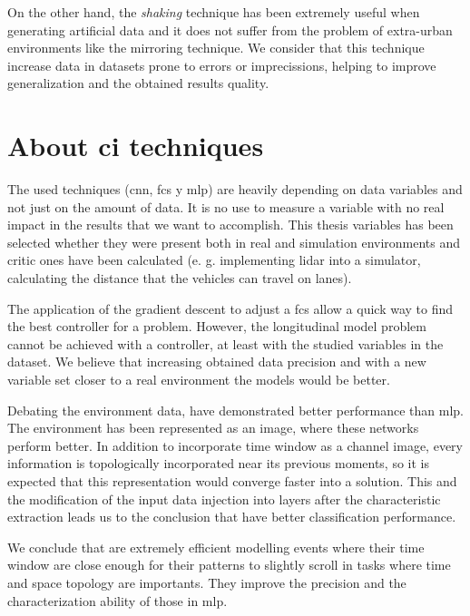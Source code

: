 On the other hand, the \textit{shaking} technique has been extremely useful when generating artificial data and it does not suffer from the problem of extra-urban environments like the mirroring technique. We consider that this technique increase data in datasets prone to errors or imprecissions, helping to improve generalization and the obtained results quality.

\section{About \acrlong{ci} techniques}

The used techniques (\acrlong{cnn}, \acrlong{fcs} y \acrlong{mlp}) are heavily depending on data variables and not just on the amount of data. It is no use to measure a variable with no real impact in the results that we want to accomplish. This thesis variables has been selected whether they were present both in real and simulation environments and critic ones have been calculated (e. g. implementing \acrshort{lidar} into a simulator, calculating the distance that the vehicles can travel on lanes).

The application of the gradient descent to adjust a \acrlong{fcs} allow a quick way to find the best controller for a problem. However, the longitudinal model problem cannot be achieved with a controller, at least with the studied variables in the dataset. We believe that increasing obtained data precision and with a new variable set closer to a real environment the models would be better.

Debating the environment data,  have demonstrated better performance than \acrlong{mlp}. The environment has been represented as an image, where these networks perform better. In addition to incorporate time window as a channel image, every information is topologically incorporated near its previous moments, so it is expected that this representation would converge faster into a solution. This and the modification of the input data injection into layers after the characteristic extraction leads us to the conclusion that  have better classification performance.

We conclude that  are extremely efficient modelling events where their time window are close enough for their patterns to slightly scroll in tasks where time and space topology are importants. They improve the precision and the characterization ability of those in \acrlong{mlp}.


